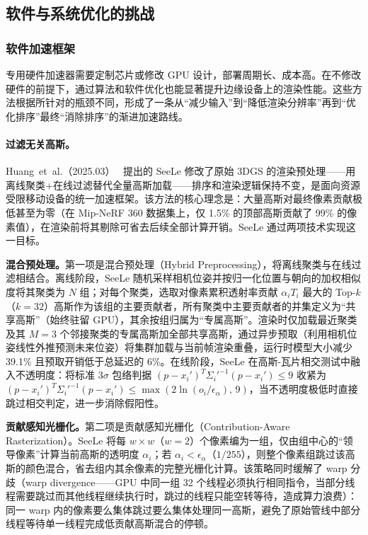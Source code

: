 \subsection{软件与系统优化的挑战}

\subsubsection{软件加速框架}

专用硬件加速器需要定制芯片或修改 GPU 设计，部署周期长、成本高。在不修改硬件的前提下，通过算法和软件优化也能显著提升边缘设备上的渲染性能。这些方法根据所针对的瓶颈不同，形成了一条从“减少输入”到“降低渲染分辨率”再到“优化排序”最终“消除排序”的渐进加速路线。

\paragraph{过滤无关高斯。}

Huang~et~al.（2025.03）~\cite{2503_05168} 提出的 SeeLe 修改了原始 3DGS 的渲染预处理——用离线聚类+在线过滤替代全量高斯加载——排序和渲染逻辑保持不变，是面向资源受限移动设备的统一加速框架。该方法的核心理念是：大量高斯对最终像素贡献极低甚至为零（在 Mip-NeRF 360 数据集上，仅 1.5\% 的顶部高斯贡献了 99\% 的像素值），在渲染前将其剔除可省去后续全部计算开销。SeeLe 通过两项技术实现这一目标。

\textbf{混合预处理。}第一项是混合预处理（Hybrid Preprocessing），将离线聚类与在线过滤相结合。离线阶段，SeeLe 随机采样相机位姿并按归一化位置与朝向的加权相似度将其聚类为 $N$ 组；对每个聚类，选取对像素累积透射率贡献 $\alpha_i T_i$ 最大的 Top-$k$（$k{=}32$）高斯作为该组的主要贡献者，所有聚类中主要贡献者的并集定义为“共享高斯”（始终驻留 GPU），其余按组归属为“专属高斯”。渲染时仅加载最近聚类及其 $M{=}3$ 个邻接聚类的专属高斯加全部共享高斯，通过异步预取（利用相机位姿线性外推预测未来位姿）将集群加载与当前帧渲染重叠，运行时模型大小减少 39.1\% 且预取开销低于总延迟的 6\%。在线阶段，SeeLe 在高斯-瓦片相交测试中融入不透明度：将标准 $3\sigma$ 包络判据 $(p - x_i')^T \Sigma_i'^{-1}(p - x_i') \leq 9$ 收紧为 $(p - x_i')^T \Sigma_i'^{-1}(p - x_i') \leq \max(2\ln(o_i/\epsilon_\alpha),\, 9)$，当不透明度极低时直接跳过相交判定，进一步消除假阳性。

\textbf{贡献感知光栅化。}第二项是贡献感知光栅化（Contribution-Aware Rasterization）。SeeLe 将每 $w{\times}w$（$w{=}2$）个像素编为一组，仅由组中心的“领导像素”计算当前高斯的透明度 $\alpha_i$；若 $\alpha_i < \epsilon_\alpha$（$1/255$），则整个像素组跳过该高斯的颜色混合，省去组内其余像素的完整光栅化计算。该策略同时缓解了 warp 分歧（warp divergence——GPU 中同一组 32 个线程必须执行相同指令，当部分线程需要跳过而其他线程继续执行时，跳过的线程只能空转等待，造成算力浪费）：同一 warp 内的像素要么集体跳过要么集体处理同一高斯，避免了原始管线中部分线程等待单一线程完成低贡献高斯混合的停顿。

